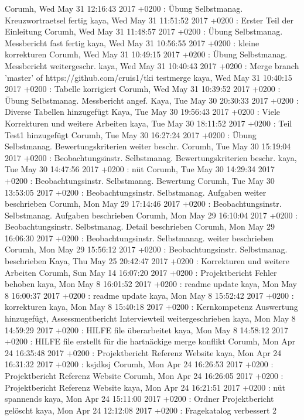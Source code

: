 Corumh, Wed May 31 12:16:43 2017 +0200 : Übung Selbstmanag. Kreuzwortraetsel fertig
kaya, Wed May 31 11:51:52 2017 +0200 : Erster Teil der Einleitung
Corumh, Wed May 31 11:48:57 2017 +0200 : Übung Selbstmanag. Messbericht fast fertig
kaya, Wed May 31 10:56:55 2017 +0200 : kleine korrekturen
Corumh, Wed May 31 10:49:15 2017 +0200 : Übung Selbstmanag. Messbericht weitergeschr.
kaya, Wed May 31 10:40:43 2017 +0200 : Merge branch 'master' of https://github.com/cruis1/tki testmerge
kaya, Wed May 31 10:40:15 2017 +0200 : Tabelle korrigiert
Corumh, Wed May 31 10:39:52 2017 +0200 : Übung Selbstmanag. Messbericht angef.
Kaya, Tue May 30 20:30:33 2017 +0200 : Diverse Tabellen hinzugefügt
Kaya, Tue May 30 19:56:43 2017 +0200 : Viele Korrekturen und weitere Arbeiten
kaya, Tue May 30 18:11:52 2017 +0200 : Teil Test1 hinzugefügt
Corumh, Tue May 30 16:27:24 2017 +0200 : Übung Selbstmanag. Bewertungskriterien weiter beschr.
Corumh, Tue May 30 15:19:04 2017 +0200 : Beobachtungsinstr. Selbstmanag. Bewertungskriterien beschr.
kaya, Tue May 30 14:47:56 2017 +0200 : nüt
Corumh, Tue May 30 14:29:34 2017 +0200 : Beobachtungsinstr. Selbstmanag. Bewertung
Corumh, Tue May 30 13:53:05 2017 +0200 : Beobachtungsinstr. Selbstmanag. Aufgaben weiter beschrieben
Corumh, Mon May 29 17:14:46 2017 +0200 : Beobachtungsinstr. Selbstmanag. Aufgaben beschrieben
Corumh, Mon May 29 16:10:04 2017 +0200 : Beobachtungsinstr. Selbstmanag. Detail beschrieben
Corumh, Mon May 29 16:06:30 2017 +0200 : Beobachtungsinstr. Selbstmanag. weiter beschrieben
Corumh, Mon May 29 15:56:12 2017 +0200 : Beobachtungsinstr. Selbstmanag. beschrieben
Kaya, Thu May 25 20:42:47 2017 +0200 : Korrekturen und weitere Arbeiten
Corumh, Sun May 14 16:07:20 2017 +0200 : Projektbericht Fehler behoben
kaya, Mon May 8 16:01:52 2017 +0200 : readme update
kaya, Mon May 8 16:00:37 2017 +0200 : readme update
kaya, Mon May 8 15:52:42 2017 +0200 : korrekturen
kaya, Mon May 8 15:40:18 2017 +0200 : Kernkompetenz Auswertung hinzugefügt, Assessmentbericht Interviewteil weitergeschrieben
kaya, Mon May 8 14:59:29 2017 +0200 : HILFE file überarbeitet
kaya, Mon May 8 14:58:12 2017 +0200 : HILFE file erstellt für die hartnäckige merge konflikt
Corumh, Mon Apr 24 16:35:48 2017 +0200 : Projektbericht Referenz Website
kaya, Mon Apr 24 16:31:32 2017 +0200 : ksjdksj
Corumh, Mon Apr 24 16:26:53 2017 +0200 : Projektbericht Referenz Website
Corumh, Mon Apr 24 16:26:05 2017 +0200 : Projektbericht Referenz Website
kaya, Mon Apr 24 16:21:51 2017 +0200 : nüt spannends
kaya, Mon Apr 24 15:11:00 2017 +0200 : Ordner Projektbericht gelöscht
kaya, Mon Apr 24 12:12:08 2017 +0200 : Fragekatalog verbessert 2

